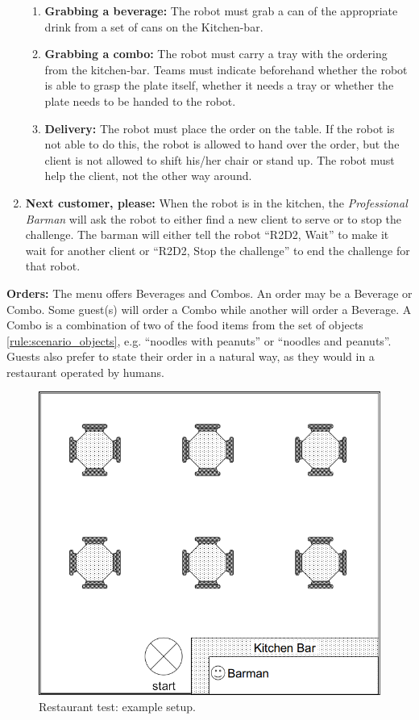 \begin{enumerate}
\begin{enumerate}
		\item \textbf{Grabbing a beverage:} The robot must grab a can of the appropriate drink from a set of cans on the Kitchen-bar. 

		\item \textbf{Grabbing a combo:}  The robot must carry a tray with the ordering from the kitchen-bar. 
		Teams must indicate beforehand whether the robot is able to grasp the plate itself, whether it needs a tray or whether the plate needs to be handed to the robot.
		
		\item \textbf{Delivery:} The robot must place the order on the table. 
		If the robot is not able to do this, the robot is allowed to hand over the order, but the client is not allowed to shift his/her chair or stand up. 
		The robot must help the client, not the other way around. 
	\end{enumerate}
	
	\item \textbf{Next customer, please:} When the robot is in the kitchen, the \textit{Professional Barman} will ask the robot to either find a new client to serve or to stop the challenge.
	The barman will either tell the robot ``R2D2, Wait'' to make it wait for another client or ``R2D2, Stop the challenge'' to end the challenge for that robot. 
\end{enumerate}

\textbf{Orders:} The menu offers Beverages and Combos. An order may be a Beverage or Combo. Some guest(s) will order a Combo while another will order a Beverage.
  A Combo is a combination of two of the food items from the set of objects \ref{rule:scenario_objects}, e.g. ``noodles with peanuts'' or ``noodles and peanuts''. 
  Guests also prefer to state their order in a natural way, as they would in a restaurant operated by humans.
  
\begin{figure}[tbp]
	\centering
	\includegraphics[width=0.5\columnwidth]{images/restaurant.png}
	\caption{Restaurant test: example setup.}
	\label{fig:restaurant}
\end{figure}

